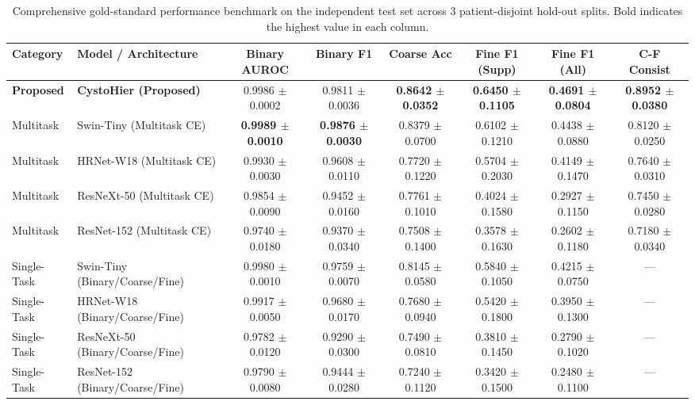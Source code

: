 \documentclass[runningheads]{llncs}
\begin{document}
\begin{table}[t]
\centering
\caption{Comprehensive gold-standard performance benchmark on the independent test set across 3 patient-disjoint hold-out splits. Bold indicates the highest value in each column.}
\label{tab:test_benchmark}
\begin{adjustbox}{max width=\textwidth}
\begin{tabular}{llcccccc}
\toprule
\textbf{Category} & \textbf{Model / Architecture} & \textbf{Binary AUROC} & \textbf{Binary F1} & \textbf{Coarse Acc} & \textbf{Fine F1 (Supp)} & \textbf{Fine F1 (All)} & \textbf{C-F Consist} \\
\midrule
\textbf{Proposed} & \textbf{CystoHier (Proposed)} & 0.9986 $\pm$ 0.0002 & 0.9811 $\pm$ 0.0036 & \textbf{0.8642 $\pm$ 0.0352} & \textbf{0.6450 $\pm$ 0.1105} & \textbf{0.4691 $\pm$ 0.0804} & \textbf{0.8952 $\pm$ 0.0380} \\
\midrule
Multitask & Swin-Tiny (Multitask CE) & \textbf{0.9989 $\pm$ 0.0010} & \textbf{0.9876 $\pm$ 0.0030} & 0.8379 $\pm$ 0.0700 & 0.6102 $\pm$ 0.1210 & 0.4438 $\pm$ 0.0880 & 0.8120 $\pm$ 0.0250 \\
Multitask & HRNet-W18 (Multitask CE) & 0.9930 $\pm$ 0.0030 & 0.9608 $\pm$ 0.0110 & 0.7720 $\pm$ 0.1220 & 0.5704 $\pm$ 0.2030 & 0.4149 $\pm$ 0.1470 & 0.7640 $\pm$ 0.0310 \\
Multitask & ResNeXt-50 (Multitask CE) & 0.9854 $\pm$ 0.0090 & 0.9452 $\pm$ 0.0160 & 0.7761 $\pm$ 0.1010 & 0.4024 $\pm$ 0.1580 & 0.2927 $\pm$ 0.1150 & 0.7450 $\pm$ 0.0280 \\
Multitask & ResNet-152 (Multitask CE) & 0.9740 $\pm$ 0.0180 & 0.9370 $\pm$ 0.0340 & 0.7508 $\pm$ 0.1400 & 0.3578 $\pm$ 0.1630 & 0.2602 $\pm$ 0.1180 & 0.7180 $\pm$ 0.0340 \\
\midrule
Single-Task & Swin-Tiny (Binary/Coarse/Fine) & 0.9980 $\pm$ 0.0010 & 0.9759 $\pm$ 0.0070 & 0.8145 $\pm$ 0.0580 & 0.5840 $\pm$ 0.1050 & 0.4215 $\pm$ 0.0750 & --- \\
Single-Task & HRNet-W18 (Binary/Coarse/Fine) & 0.9917 $\pm$ 0.0050 & 0.9680 $\pm$ 0.0170 & 0.7680 $\pm$ 0.0940 & 0.5420 $\pm$ 0.1800 & 0.3950 $\pm$ 0.1300 & --- \\
Single-Task & ResNeXt-50 (Binary/Coarse/Fine) & 0.9782 $\pm$ 0.0120 & 0.9290 $\pm$ 0.0300 & 0.7490 $\pm$ 0.0810 & 0.3810 $\pm$ 0.1450 & 0.2790 $\pm$ 0.1020 & --- \\
Single-Task & ResNet-152 (Binary/Coarse/Fine) & 0.9790 $\pm$ 0.0080 & 0.9444 $\pm$ 0.0280 & 0.7240 $\pm$ 0.1120 & 0.3420 $\pm$ 0.1500 & 0.2480 $\pm$ 0.1100 & --- \\
\bottomrule
\end{tabular}
\end{adjustbox}
\end{table}
\end{document}
